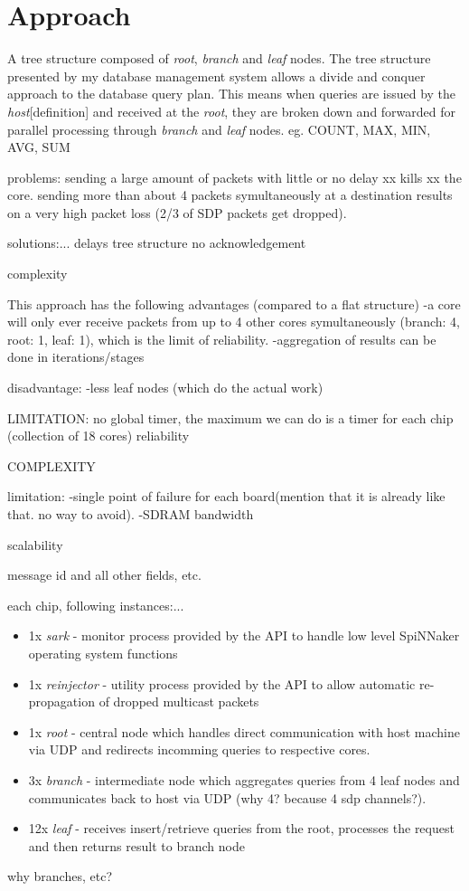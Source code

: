 \section{Approach}

A tree structure composed of \textit{root}, \textit{branch} and \textit{leaf} nodes. The tree structure presented by my database management system allows a divide and conquer approach to the database query plan. This means when queries are issued by the \textit{host}[definition] and received at the \textit{root}, they are broken down and forwarded for parallel processing through \textit{branch} and \textit{leaf} nodes. eg. COUNT, MAX, MIN, AVG, SUM

problems:
sending a large amount of packets with little or no delay xx kills xx the core. sending more than about 4 packets symultaneously at a destination results on a very high packet loss (2/3 of SDP packets get dropped).


solutions:...
delays
tree structure
no acknowledgement


complexity


This approach has the following advantages (compared to a flat structure)
-a core will only ever receive packets from up to 4 other cores symultaneously (branch: 4, root: 1, leaf: 1), which is the limit of reliability.
-aggregation of results can be done in iterations/stages

disadvantage:
-less leaf nodes (which do the actual work)

LIMITATION:
no global timer, the maximum we can do is a timer for each chip (collection of 18 cores)
reliability

COMPLEXITY

limitation:
-single point of failure for each board(mention that it is already like that. no way to avoid).
-SDRAM bandwidth

scalability

message id and all other fields, etc.

each chip, following instances:...

\begin{itemize}
\item 1x \textit{sark} - monitor process provided by the API to handle low level SpiNNaker operating system functions
\item 1x \textit{reinjector} - utility process provided by the API to allow automatic re-propagation of dropped multicast packets
\item 1x \textit{root} - central node which handles direct communication with host machine via UDP and redirects incomming queries to respective cores. 
\item 3x \textit{branch} - intermediate node which aggregates queries from 4 leaf nodes and communicates back to host via UDP (why 4? because 4 sdp channels?). 
\item 12x \textit{leaf} - receives insert/retrieve queries from the root, processes the request and then returns result to branch node
\end{itemize}
why branches, etc?


